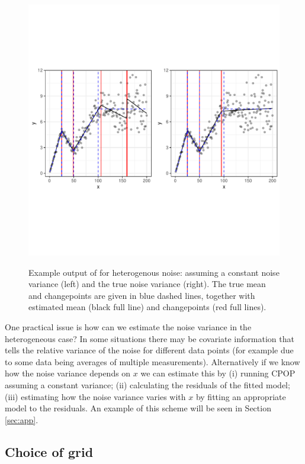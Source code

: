 \documentclass[article]{jss}
\begin{document}
\begin{figure}
\centering
{\includegraphics[scale=.5,width=14cm,trim={0 4cm 0 4cm},clip]{figures/cpop_uneven_examples_ggplot.pdf}}
\caption{Example output of  for heterogenous noise: assuming a constant noise variance (left) and the true noise variance (right). The true mean and changepoints are given in blue dashed lines, together with estimated mean (black full line) and changepoints (red full lines). }
\label{fig:cpop-example-heterogeneous}
\end{figure}

One practical issue is how can we estimate the noise variance in the heterogeneous case? In some situations there may be covariate information that tells the relative variance of the noise for different data points (for example due to some data being averages of multiple measurements). Alternatively if we know how the noise variance depends on $x$ we can estimate this by (i) running CPOP assuming a constant variance; (ii) calculating the residuals of the fitted model; (iii) estimating how the noise variance varies with $x$ by fitting an appropriate model to the residuals. An example of this scheme will be seen in Section \ref{sec:app}. 


\subsection{Choice of grid}
\end{document}
